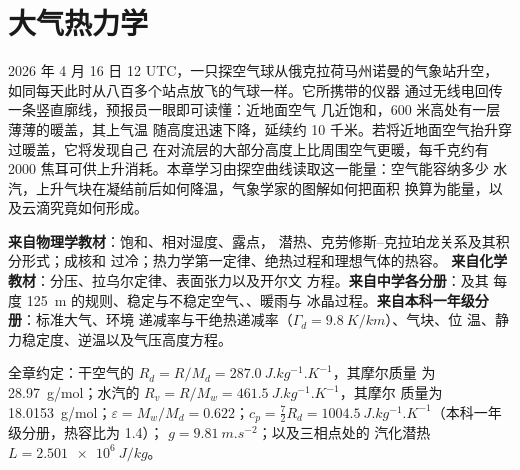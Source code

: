\chapter{大气热力学}\label{ch:b2:atmospheric-thermodynamics}

2026 年 4 月 16 日 12 UTC，一只探空气球从俄克拉荷马州诺曼的气象站升空，
如同每天此时从八百多个站点放飞的气球一样。它所携带的仪器
通过无线电回传一条竖直廓线，预报员一眼即可读懂：近地面空气
几近饱和，600 米高处有一层薄薄的暖盖，其上气温
随高度迅速下降，延续约 10 千米。若将近地面空气抬升穿过暖盖，它将发现自己
在对流层的大部分高度上比周围空气更暖，每千克约有
2000 焦耳可供上升消耗。本章学习由探空曲线读取这一能量：空气能容纳多少
水汽，上升气块在凝结前后如何降温，气象学家的图解如何把面积
换算为能量，以及云滴究竟如何形成。

\begin{recall}
\textbf{来自物理学教材}：饱和、相对湿度、露点，
潜热、克劳修斯–克拉珀龙关系及其积分形式；成核和
过冷；热力学第一定律、绝热过程和理想气体的热容。
\textbf{来自化学教材}：分压、拉乌尔定律、表面张力以及开尔文
方程。\textbf{来自中学各分册}：及其
每度 \qty{125}{m} 的规则、稳定与不稳定空气、、暖雨与
冰晶过程。\textbf{来自本科一年级分册}：标准大气、环境
递减率与干绝热递减率（$\Gamma_d = \qty{9.8}{K/km}$）、气块、位
温、静力稳定度、逆温以及气压高度方程。
\end{recall}

全章约定：干空气的 $R_d = R/M_d = \qty{287.0}{J.kg^{-1}.K^{-1}}$，其摩尔质量
为 \qty{28.97}{g/mol}；水汽的 $R_v = R/M_w = \qty{461.5}{J.kg^{-1}.K^{-1}}$，其摩尔
质量为 \qty{18.0153}{g/mol}；$\varepsilon = M_w/M_d = 0.622$；$c_p = \tfrac72 R_d =
\qty{1004.5}{J.kg^{-1}.K^{-1}}$（本科一年级分册，热容比为 1.4）；
$g = \qty{9.81}{m.s^{-2}}$；以及三相点处的
汽化潜热 $L = \qty{2.501e6}{J/kg}$。

